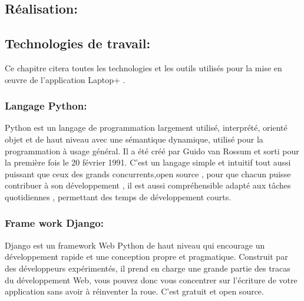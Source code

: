 \documentclass[a4paper]{report}
\begin{document}
\begin{doublespace}
\begin{doublespace}
\begin{doublespace}
\begin{doublespace}
\begin{doublespace}
\chapter{Réalisation:}
\fancyhead[L]{\hspace*{5cm}}
\begin{doublespace}

\section{Technologies de travail:}
Ce chapitre citera toutes les technologies et les outils utilisés pour la mise en œuvre de l'application Laptop+ .
\subsection{Langage Python:}
\begin{figure}[H]
\end{figure}
Python est un langage de programmation largement utilisé, interprété, orienté objet et de haut niveau avec une sémantique dynamique, utilisé pour la programmation à usage général. Il a été créé par Guido van Rossum et sorti pour la première fois le 20 février 1991. C'est un langage simple et intuitif tout aussi puissant que ceux des grands concurrents,open source , pour que chacun puisse contribuer à son développement , il est aussi compréhensible 
adapté aux tâches quotidiennes , permettant des temps de développement courts.

\newpage

\subsection{Frame work Django:}
\begin{figure}[H]
\end{figure}
 Django est un framework Web Python de haut niveau qui encourage un développement rapide et une conception propre et pragmatique. Construit par des développeurs expérimentés, il prend en charge une grande partie des tracas du développement Web, vous pouvez donc vous concentrer sur l'écriture de votre application sans avoir à réinventer la roue. C'est gratuit et open source.


\end{doublespace}
\end{doublespace}
\end{doublespace}
\end{doublespace}
\end{doublespace}
\end{doublespace}
\end{document}
